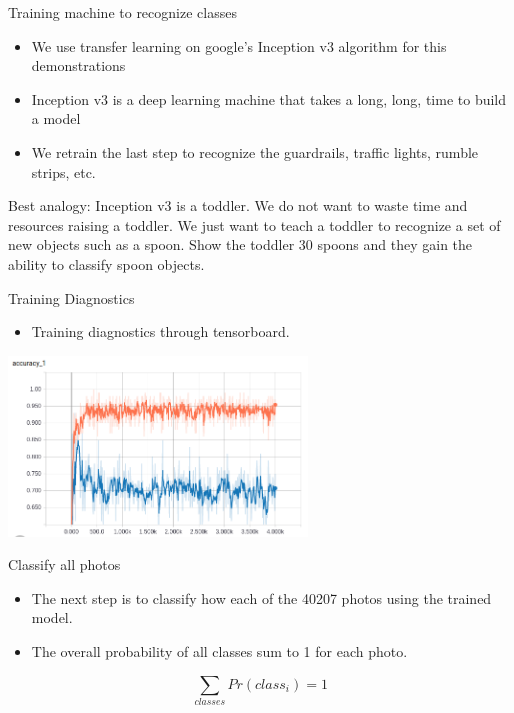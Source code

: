 \documentclass[ignorenonframetext,]{beamer}
\providecommand{\tightlist}{%
  \setlength{\itemsep}{0pt}\setlength{\parskip}{0pt}}
\begin{document}
\begin{frame}{Training machine to recognize classes}

\begin{itemize}
\tightlist
\item
  We use transfer learning on google's Inception v3 algorithm for this
  demonstrations
\item
  Inception v3 is a deep learning machine that takes a long, long, time
  to build a model
\item
  We retrain the last step to recognize the guardrails, traffic lights,
  rumble strips, etc.
\end{itemize}

Best analogy: Inception v3 is a toddler. We do not want to waste time
and resources raising a toddler. We just want to teach a toddler to
recognize a set of new objects such as a spoon. Show the toddler 30
spoons and they gain the ability to classify spoon objects.

\end{frame}

\begin{frame}{Training Diagnostics}

\begin{itemize}
\tightlist
\item
  Training diagnostics through tensorboard.
\end{itemize}

\includegraphics[width=300px]{Images/tensorTraining}

\end{frame}

\begin{frame}{Classify all photos}

\begin{itemize}
\tightlist
\item
  The next step is to classify how each of the 40207 photos using the
  trained model.
\item
  The overall probability of all classes sum to 1 for each photo.
\end{itemize}

\[ \sum_{classes} Pr(class_i) = 1\]

\end{frame}
\end{document}
